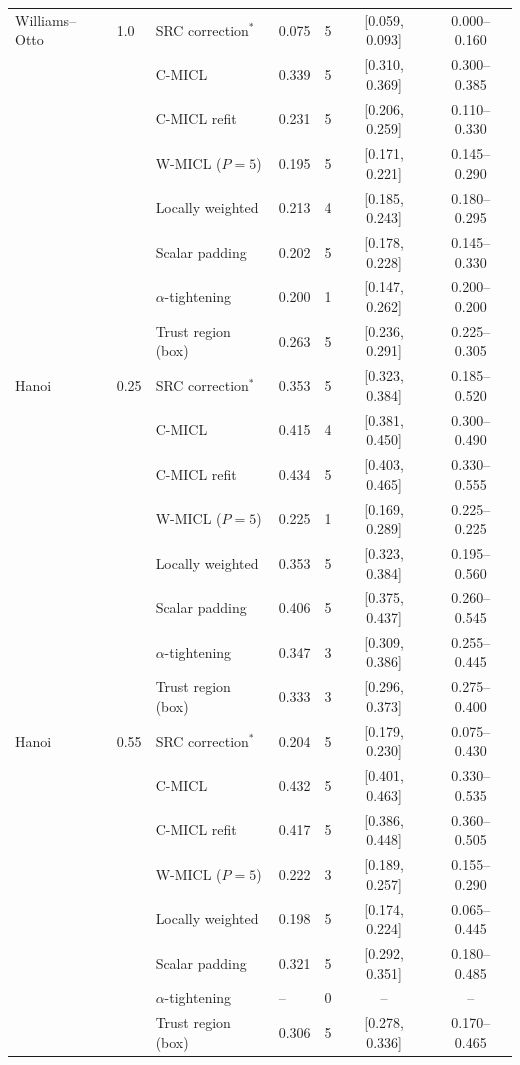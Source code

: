 {\begin{longtable}{llllccc}
Williams--Otto & 1.0 & SRC correction$^{\ast}$ & 0.075 & 5 & [0.059, 0.093] & 0.000--0.160 \\
 &  & C-MICL & 0.339 & 5 & [0.310, 0.369] & 0.300--0.385 \\
 &  & C-MICL refit & 0.231 & 5 & [0.206, 0.259] & 0.110--0.330 \\
 &  & W-MICL ($P{=}5$) & 0.195 & 5 & [0.171, 0.221] & 0.145--0.290 \\
 &  & Locally weighted & 0.213 & 4 & [0.185, 0.243] & 0.180--0.295 \\
 &  & Scalar padding & 0.202 & 5 & [0.178, 0.228] & 0.145--0.330 \\
 &  & $\alpha$-tightening & 0.200 & 1 & [0.147, 0.262] & 0.200--0.200 \\
 &  & Trust region (box) & 0.263 & 5 & [0.236, 0.291] & 0.225--0.305 \\
\addlinespace[2pt]
Hanoi & 0.25 & SRC correction$^{\ast}$ & 0.353 & 5 & [0.323, 0.384] & 0.185--0.520 \\
 &  & C-MICL & 0.415 & 4 & [0.381, 0.450] & 0.300--0.490 \\
 &  & C-MICL refit & 0.434 & 5 & [0.403, 0.465] & 0.330--0.555 \\
 &  & W-MICL ($P{=}5$) & 0.225 & 1 & [0.169, 0.289] & 0.225--0.225 \\
 &  & Locally weighted & 0.353 & 5 & [0.323, 0.384] & 0.195--0.560 \\
 &  & Scalar padding & 0.406 & 5 & [0.375, 0.437] & 0.260--0.545 \\
 &  & $\alpha$-tightening & 0.347 & 3 & [0.309, 0.386] & 0.255--0.445 \\
 &  & Trust region (box) & 0.333 & 3 & [0.296, 0.373] & 0.275--0.400 \\
\addlinespace[2pt]
Hanoi & 0.55 & SRC correction$^{\ast}$ & 0.204 & 5 & [0.179, 0.230] & 0.075--0.430 \\
 &  & C-MICL & 0.432 & 5 & [0.401, 0.463] & 0.330--0.535 \\
 &  & C-MICL refit & 0.417 & 5 & [0.386, 0.448] & 0.360--0.505 \\
 &  & W-MICL ($P{=}5$) & 0.222 & 3 & [0.189, 0.257] & 0.155--0.290 \\
 &  & Locally weighted & 0.198 & 5 & [0.174, 0.224] & 0.065--0.445 \\
 &  & Scalar padding & 0.321 & 5 & [0.292, 0.351] & 0.180--0.485 \\
 &  & $\alpha$-tightening & -- & 0 & -- & -- \\
 &  & Trust region (box) & 0.306 & 5 & [0.278, 0.336] & 0.170--0.465 \\

\end{longtable}}
